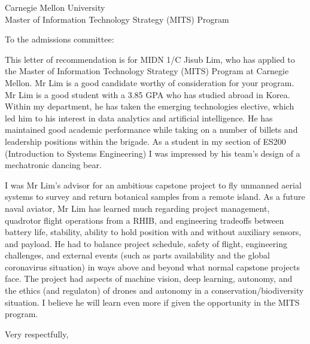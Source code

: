 \documentclass[12pt]{wrceletter}
\date{\today}
\begin{document}
\begin{letter}{%
Carnegie Mellon University\\
Master of Information Technology Strategy (MITS) Program}

\opening{To the admissions committee:}
\raggedright %
\setlength{\parindent}{15pt} %

This letter of recommendation is for MIDN 1/C Jisub Lim, who has applied to the Master of Information Technology Strategy (MITS) Program at Carnegie Mellon. Mr Lim is a good candidate worthy of consideration for your program. Mr Lim is a good student with a 3.85 GPA who has studied abroad in Korea. Within my department, he has taken the emerging technologies elective, which led him to his interest in data analytics and artificial intelligence. He has maintained good academic performance while taking on a number of billets and leadership positions within the brigade. As a student in my section of ES200 (Introduction to Systems Engineering) I was impressed by his team’s design of a mechatronic dancing bear.

I was Mr Lim’s advisor for an ambitious capstone project to fly unmanned aerial systems to survey and return botanical samples from a remote island. As a future naval aviator, Mr Lim has learned much regarding project management, quadrotor flight operations from a RHIB, and engineering tradeoffs between battery life, stability, ability to hold position with and without auxiliary sensors, and payload. He had to balance project schedule, safety of flight, engineering challenges, and external events (such as parts availability and the global coronavirus situation) in ways above and beyond what normal capstone projects face. The project had aspects of machine vision, deep learning, autonomy, and the ethics (and regulaton) of drones and autonomy in a conservation/biodiversity situation. I believe he will learn even more if given the opportunity in the MITS program.



\closing{Very respectfully,} %

\end{letter}
\end{document}
